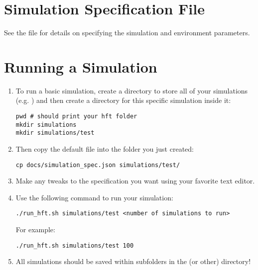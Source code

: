 \documentclass[11pt]{article}
\begin{document}
\section{Simulation Specification File}

See the  file for details on specifying the simulation and environment parameters.

\section{Running a Simulation}

\begin{enumerate}
\item To run a basic simulation, create a directory to store all of your
  simulations (e.g. ) and then create a directory for this
  specific simulation inside it:

\begin{verbatim}
pwd # should print your hft folder
mkdir simulations
mkdir simulations/test
\end{verbatim}

\item Then copy the default  file into the folder you
  just created:

\begin{verbatim}
cp docs/simulation_spec.json simulations/test/
\end{verbatim}

\item Make any tweaks to the specification you want using your favorite text
  editor.

\item Use the following command to run your simulation:

\begin{verbatim}
./run_hft.sh simulations/test <number of simulations to run>
\end{verbatim}

For example:

\begin{verbatim}
./run_hft.sh simulations/test 100
\end{verbatim}

\item All simulations should be saved within subfolders in the 
(or other) directory!

\end{enumerate}
\end{document}
